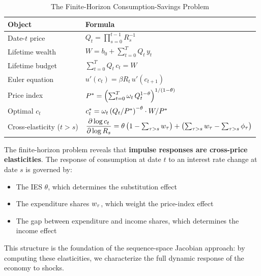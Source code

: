 \begin{table}[H]
\centering
\caption{The Finite-Horizon Consumption-Savings Problem}
\label{tab:T-period-summary}
\renewcommand{\arraystretch}{1.6}
\begin{tabular}{@{}ll@{}}
\toprule
\textbf{Object} & \textbf{Formula} \\
\midrule
Date-$t$ price & $Q_t = \prod_{s=0}^{t-1} R_s^{-1}$ \\[6pt]
Lifetime wealth & $W = b_0 + \sum_{t=0}^{T} Q_t \, y_t$ \\[6pt]
Lifetime budget & $\sum_{t=0}^{T} Q_t \, c_t = W$ \\[6pt]
Euler equation & $u'(c_t) = \beta R_t \, u'(c_{t+1})$ \\[6pt]
Price index & $P^{*} = \left( \sum_{t=0}^{T} \omega_t \, Q_t^{1-\theta} \right)^{1/(1-\theta)}$ \\[6pt]
Optimal $c_t$ & $c_t^* = \omega_t \left( Q_t / P^{*} \right)^{-\theta} \cdot W / P^{*}$ \\[6pt]
Cross-elasticity ($t > s$) & $\dfrac{\partial \log c_t}{\partial \log R_s} = \theta \left( 1 - \sum_{\tau > s} w_{\tau} \right) + \left( \sum_{\tau > s} w_{\tau} - \sum_{\tau > s} \phi_{\tau} \right)$ \\[8pt]
\bottomrule
\end{tabular}
\end{table}

\begin{callouttip}
The finite-horizon problem reveals that \textbf{impulse responses are cross-price elasticities}. The response of consumption at date $t$ to an interest rate change at date $s$ is governed by:
\begin{itemize}[nosep]
\item The IES $\theta$, which determines the substitution effect
\item The expenditure shares $w_{\tau}$, which weight the price-index effect
\item The gap between expenditure and income shares, which determines the income effect
\end{itemize}
This structure is the foundation of the sequence-space Jacobian approach: by computing these elasticities, we characterize the full dynamic response of the economy to shocks.
\end{callouttip}
